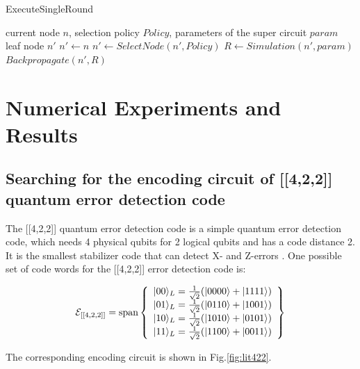 \documentclass{ieeeaccess}
\begin{document}
\begin{algorithm}[H]
\caption{ExecuteSingleRound}\label{alg:executeSingleRound}
\begin{algorithmic}
\Require current node $n$, selection policy $Policy$, parameters of the super circuit $param$
\Ensure leaf node $n'$
\State $n'\gets n$
\State $n'\gets SelectNode(n', Policy)$
\EndWhile
\State $R \gets Simulation(n', param)$  
\State $Backpropagate(n', R)$ 
\end{algorithmic}
\end{algorithm}

\section{Numerical Experiments and Results}\label{experiments}
\subsection{Searching for the encoding circuit of [[4,2,2]] quantum error detection code}\label{422}

The [[4,2,2]] quantum error detection code is a simple quantum error detection code, which needs 4 physical qubits for 2 logical qubits and has a code distance 2. It is the smallest stabilizer code that can detect X- and Z-errors \cite{qec_intro_guide}. One possible set of code words for the [[4,2,2]] error detection code is:


\begin{equation}
\mathcal{E}_{\rm [[4,2,2]]}=\operatorname{span}\left\{\begin{array}{l}
|00\rangle_{L}=\frac{1}{\sqrt{2}}(|0000\rangle+|1111\rangle) \\
|01\rangle_{L}=\frac{1}{\sqrt{2}}(|0110\rangle+|1001\rangle) \\
|10\rangle_{L}=\frac{1}{\sqrt{2}}(|1010\rangle+|0101\rangle) \\
|11\rangle_{L}=\frac{1}{\sqrt{2}}(|1100\rangle+|0011\rangle)
\end{array}\right\}
\end{equation}

The corresponding encoding circuit is shown in Fig.\ref{fig:lit422}.
\end{document}
